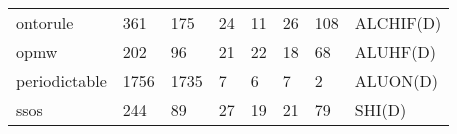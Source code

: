 \begin{table}
\begin{tabular}{m{3.5cm}m{1cm}m{1cm}m{1cm}m{1cm}m{1cm}m{1cm}m{1cm}}
ontorule                    &       361 &               175 &         24 &                   11 &                     26 &                      108 &        ALCHIF(D) \\
opmw                        &       202 &                96 &         21 &                   22 &                     18 &                       68 &         ALUHF(D) \\
periodictable               &      1756 &              1735 &          7 &                    6 &                      7 &                        2 &         ALUON(D) \\
ssos                        &       244 &                89 &         27 &                   19 &                     21 &                       79 &           SHI(D) \\
\bottomrule
\end{tabular}
\end{table}
